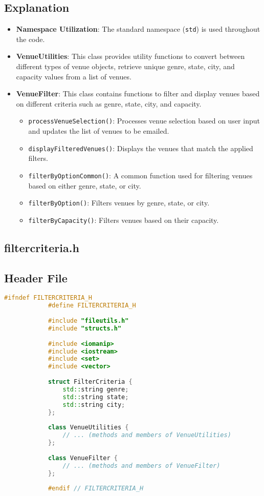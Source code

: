\documentclass{article}
\begin{document}
	\subsection*{Explanation}
	\begin{itemize}
		\item \textbf{Namespace Utilization}: The standard namespace (\texttt{std}) is used throughout the code.
		\item \textbf{VenueUtilities}: This class provides utility functions to convert between different types of venue objects, retrieve unique genre, state, city, and capacity values from a list of venues.
		\item \textbf{VenueFilter}: This class contains functions to filter and display venues based on different criteria such as genre, state, city, and capacity.
		\begin{itemize}
			\item \texttt{processVenueSelection()}: Processes venue selection based on user input and updates the list of venues to be emailed.
			\item \texttt{displayFilteredVenues()}: Displays the venues that match the applied filters.
			\item \texttt{filterByOptionCommon()}: A common function used for filtering venues based on either genre, state, or city.
			\item \texttt{filterByOption()}: Filters venues by genre, state, or city.
			\item \texttt{filterByCapacity()}: Filters venues based on their capacity.
		\end{itemize}
	\end{itemize}
	
	\subsection{filtercriteria.h}
	
	\subsection*{Header File}
	\begin{mdframed}[backgroundcolor=background, hidealllines=false, innerleftmargin=15pt, innerrightmargin=5pt, innertopmargin=0pt, innerbottommargin=-5pt, linecolor=accent]
		\begin{lstlisting}[language=C++]
			#ifndef FILTERCRITERIA_H
			#define FILTERCRITERIA_H
			
			#include "fileutils.h"
			#include "structs.h"
			
			#include <iomanip>
			#include <iostream>
			#include <set>
			#include <vector>
			
			struct FilterCriteria {
				std::string genre;
				std::string state;
				std::string city;
			};
			
			class VenueUtilities {
				// ... (methods and members of VenueUtilities)
			};
			
			class VenueFilter {
				// ... (methods and members of VenueFilter)
			};
			
			#endif // FILTERCRITERIA_H
		\end{lstlisting}
	\end{mdframed}
	
\end{document}
